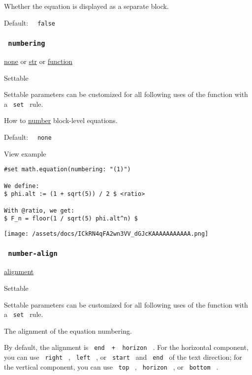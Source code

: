 Whether the equation is displayed as a separate block.

Default: \texttt{\ }{\texttt{\ false\ }}\texttt{\ }

\subsubsection{\texorpdfstring{\texttt{\ numbering\ }}{ numbering }}\label{parameters-numbering}

\href{/docs/reference/foundations/none/}{none} {or}
\href{/docs/reference/foundations/str/}{str} {or}
\href{/docs/reference/foundations/function/}{function}

{{ Settable }}

\label{parameters-numbering-settable-tooltip}
Settable parameters can be customized for all following uses of the
function with a \texttt{\ set\ } rule.

How to \href{/docs/reference/model/numbering/}{number} block-level
equations.

Default: \texttt{\ }{\texttt{\ none\ }}\texttt{\ }


View example

\begin{verbatim}
#set math.equation(numbering: "(1)")

We define:
$ phi.alt := (1 + sqrt(5)) / 2 $ <ratio>

With @ratio, we get:
$ F_n = floor(1 / sqrt(5) phi.alt^n) $
\end{verbatim}

\texttt{[image: /assets/docs/ICkRN4qFA2wn3VV\_dGJcKAAAAAAAAAAA.png]}

\subsubsection{\texorpdfstring{\texttt{\ number-align\ }}{ number-align }}\label{parameters-number-align}

\href{/docs/reference/layout/alignment/}{alignment}

{{ Settable }}

\label{parameters-number-align-settable-tooltip}
Settable parameters can be customized for all following uses of the
function with a \texttt{\ set\ } rule.

The alignment of the equation numbering.

By default, the alignment is
\texttt{\ end\ }{\texttt{\ +\ }}\texttt{\ horizon\ } . For the
horizontal component, you can use \texttt{\ right\ } , \texttt{\ left\ }
, or \texttt{\ start\ } and \texttt{\ end\ } of the text direction; for
the vertical component, you can use \texttt{\ top\ } ,
\texttt{\ horizon\ } , or \texttt{\ bottom\ } .

